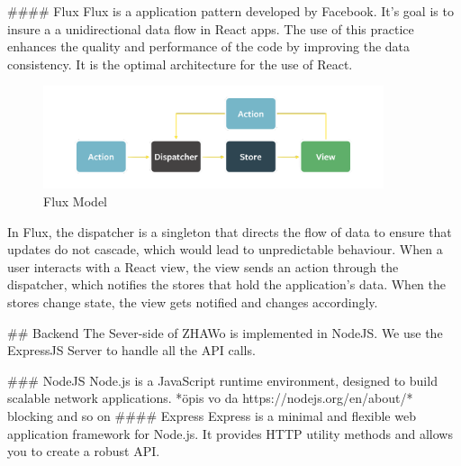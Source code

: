 \begin{markdown}
#### Flux
Flux\cite{OurReadme} is a application pattern developed by Facebook. It's goal is to insure a a unidirectional data flow in React apps. The use of this practice enhances the quality and performance of the code by improving the data consistency. It is the optimal architecture for the use of React.

\begin{figure}[H]
  \includegraphics[width=10cm, center]{./assets/flux.png}
  \caption{Flux Model{\cite{FluxModel}}}
\end{figure}




In Flux, the dispatcher is a singleton that directs the flow of data to ensure that updates do not cascade, which would lead to unpredictable behaviour. When a user interacts with a React view, the view sends an action through the dispatcher, which notifies the stores that hold the application’s data. When the stores change state, the view gets notified and changes accordingly.


## Backend
The Sever-side of ZHAWo is implemented in NodeJS\cite{Node}. We use the ExpressJS Server to handle all the API calls.

### NodeJS
Node.js is a JavaScript runtime environment, designed to build scalable network applications\cite{Node}.
*öpis vo da https://nodejs.org/en/about/* blocking and so on
#### Express
Express\cite{Express} is a minimal and flexible web application framework for Node.js. It provides HTTP utility methods and allows you to create a robust API.




\end{markdown}
